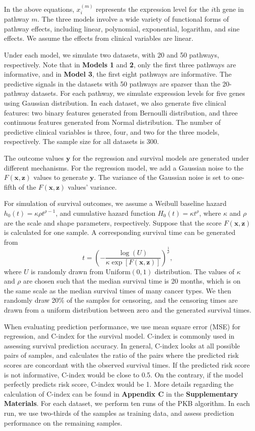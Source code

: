 \documentclass[a4paper,12pt]{article}
\newcommand{\bd}[1]{\mathbf{#1}}
\newcommand{\pathexpr}[3]{{#1}_{#2}^{(#3)}}
\begin{document}
In the above equations, $\pathexpr{x}{i}{m}$ represents the  expression level for the $i$th gene in pathway $m$. The three models involve a wide variety of functional forms of pathway effects, including linear, polynomial, exponential, logarithm, and sine effects. We assume the effects from clinical variables are linear. 

Under each model, we simulate two datasets, with 20 and 50 pathways, respectively. Note that in \textbf{Models 1} and \textbf{2}, only the first three pathways are informative, and in \textbf{Model 3}, the first eight pathways are informative. The predictive signals in the datasets with 50 pathways are sparser than the 20-pathway datasets. For each pathway, we simulate expression levels for five genes using Gaussian distribution. In each dataset, we also generate five clinical features: two binary features generated from Bernoulli distribution, and three continuous features generated from Normal distribution. The number of predictive clinical variables is three, four, and two for the three models, respectively. The sample size for all datasets is 300.

The outcome values $\bd{y}$ for the regression and survival models are generated under different mechanisms. For the regression model, we add a Gaussian noise to the $F(\bd{x}, \bd{z})$ values to generate $\bd{y}$. The variance of the Gaussian noise is set to one-fifth of the $F(\bd{x}, \bd{z})$ values' variance.

For simulation of survival outcomes, we assume a Weibull baseline hazard $h_0(t) = \kappa \rho t^{\rho-1}$, and cumulative hazard function $H_0(t) = \kappa t^{\rho}$, where $\kappa$ and $\rho$ are the scale and shape parameters, respectively. Suppose that the score $F(\bd{x},\bd{z})$ is calculated for one sample. A corresponding survival time can be generated from
$$t = \left( - \frac{\log(U)}{\kappa \exp[F(\bd{x},\bd{z})]} \right)^{\frac{1}{\rho}},$$
where $U$ is randomly drawn from $\mbox{Uniform}(0,1)$ distribution. \citep{bender2005generating} The values of $\kappa$ and $\rho$ are chosen such that the median survival time is 20 months, which is on the same scale as the median survival times of many cancer types. We then randomly draw 20\% of the samples for censoring, and the censoring times are drawn from a uniform distribution between zero and the generated survival times.

When evaluating prediction performance, we use mean square error (MSE) for regression, and C-index for the survival model.\citep{harrell1982evaluating} C-index is commonly used in assessing survival prediction accuracy. In general, C-index looks at all possible pairs of samples, and calculates the ratio of the pairs where the predicted risk scores are concordant with the observed survival times. If the predicted risk score is not informative, C-index would be close to 0.5. On the contrary, if the model perfectly predicts risk score, C-index would be 1. More details regarding the calculation of C-index can be found in \textbf{Appendix C} in the \textbf{Supplementary Materials}. For each dataset, we perform ten runs of the PKB algorithm. In each run, we use two-thirds of the samples as training data, and assess prediction performance on the remaining samples. 
\end{document}
